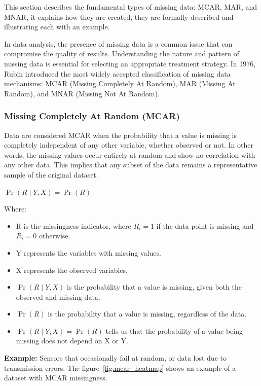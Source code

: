 \documentclass[a4paper,12pt]{article}
\begin{document}
This section describes the fundamental types of missing data: MCAR, MAR, and MNAR, it explains how they are created, they are formally described and illustrating each with an example.

In data analysis, the presence of missing data is a common issue that can compromise the quality of results. Understanding the nature and pattern of missing data is essential for selecting an appropriate treatment strategy. In 1976, Rubin introduced the most widely accepted classification of missing data mechanisms: MCAR (Missing Completely At Random), MAR (Missing At Random), and MNAR (Missing Not At Random). ~\cite{4}

\subsubsection{Missing Completely At Random (MCAR)}

Data are considered MCAR when the probability that a value is missing is completely independent of any other variable, whether observed or not. In other words, the missing values occur entirely at random and show no correlation with any other data. This implies that any subset of the data remains a representative sample of the original dataset. ~\cite{24}


\begin{center}
$\Pr(R \mid Y, X) = \Pr(R)$
\end{center}

Where:
\begin{itemize}
\item R is the missingness indicator, where  \( R_i = 1 \) if the data point is missing and  \( R_i = 0\) otherwise.
\item Y represents the variables with missing values.
\item X represents the observed variables.
\item $\Pr(R \mid Y, X)$ is the probability that a value is missing, given both the observed and missing data.
\item $\Pr(R)$ is the probability that a value is missing, regardless of the data.
\item $\Pr(R \mid Y, X) = \Pr(R)$ tells us that the probability of a value being missing does not depend on X or Y. 
\end{itemize}

\textbf{Example:} Sensors that occasionally fail at random, or data lost due to transmission errors. The figure~\ref{fig:mcar_heatmap} shows an example of a dataset with MCAR missingness. 
\end{document}
